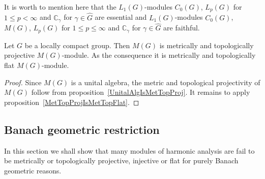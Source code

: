 It is worth to mention here that the $L_1(G)$-modules $C_0(G)$, $L_p(G)$ for
$1\leq p<\infty$ and $\mathbb{C}_\gamma$ for $\gamma\in\widehat{G}$ are
essential and $L_1(G)$-modules $C_0(G)$, $M(G)$, $L_p(G)$ for $1\leq p\leq
\infty$ and $\mathbb{C}_\gamma$ for $\gamma\in\widehat{G}$ are faithful. 

\begin{proposition}\label{MGModMGMetTopProjFlatCharac} Let $G$ be a locally
compact group. Then $M(G)$ is metrically and topologically projective
$M(G)$-module. As the consequence it is metrically and topologically flat
$M(G)$-module.
\end{proposition} 
\begin{proof} Since $M(G)$ is a unital algebra, the metric and topological
projectivity of $M(G)$ follow from proposition~\ref{UnitalAlgIsMetTopProj}. It
remains to apply proposition~\ref{MetTopProjIsMetTopFlat}.
\end{proof}


\subsection{
    Banach geometric restriction}\label{
SubSectionBanachGeometricRestriction}

In this section we shall show that many modules of harmonic analysis are fail to
be metrically or topologically projective, injective or flat for purely Banach
geometric reasons. 


